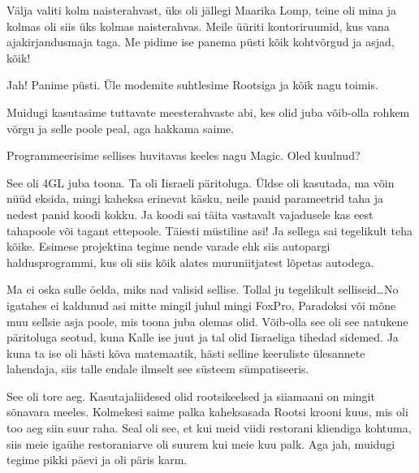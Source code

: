 Välja valiti kolm naisterahvast, üks oli jällegi Maarika Lomp, teine oli mina ja kolmas oli siis üks kolmas naisterahvas. Meile üüriti kontoriruumid, kus vana ajakirjandusmaja taga. Me pidime ise panema püsti kõik kohtvõrgud ja asjad, kõik! 


Jah! Panime püsti. Üle modemite suhtlesime Rootsiga ja kõik nagu toimis. 

Muidugi kasutasime tuttavate meesterahvaste abi, kes olid juba võib-olla rohkem  võrgu ja selle poole peal, aga hakkama saime. 

Programmeerisime sellises huvitavas keeles nagu Magic. Oled kuulnud? 


See oli 4GL juba toona. Ta oli Iisraeli päritoluga. Üldse oli kasutada,  ma võin nüüd eksida, mingi kaheksa erinevat käsku, neile panid parameetrid taha ja nedest panid koodi kokku. Ja koodi sai täita vastavalt vajadusele kas eest tahapoole või tagant ettepoole. Täiesti müstiline asi! Ja sellega sai tegelikult teha kõike. Esimese projektina tegime nende varade ehk siis autopargi haldusprogrammi, kus oli siis kõik alates muruniitjatest lõpetas autodega. 


Ma ei oska sulle öelda, miks nad valisid sellise. Tollal ju tegelikult selliseid\ldots No igatahes ei kaldunud asi mitte mingil juhul mingi FoxPro, Paradoksi või mõne muu sellsie asja poole, mis toona juba olemas olid. Võib-olla see oli see natukene päritoluga seotud, kuna Kalle ise juut ja tal olid Iisraeliga tihedad sidemed. Ja kuna ta ise oli hästi kõva matemaatik, hästi selline keeruliste ülesannete lahendaja, siis talle endale ilmselt see süsteem sümpatiseeris. 

See oli tore aeg. Kasutajaliidesed olid rootsikeelsed ja siiamaani on mingit sõnavara meeles. Kolmekesi saime palka kaheksasada Rootsi krooni kuus, mis oli too aeg siin suur raha. Seal oli see, et kui meid viidi restorani kliendiga kohtuma, siis meie igaühe restoraniarve oli suurem kui meie kuu palk. Aga jah, muidugi tegime  pikki päevi ja oli päris karm. 

